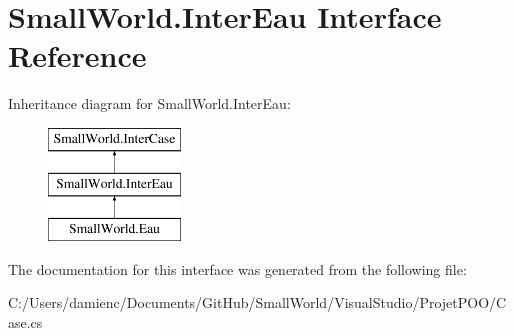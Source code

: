 \hypertarget{interface_small_world_1_1_inter_eau}{\section{Small\-World.\-Inter\-Eau Interface Reference}
\label{interface_small_world_1_1_inter_eau}
}
Inheritance diagram for Small\-World.\-Inter\-Eau\-:\begin{figure}[H]
\begin{center}
\leavevmode
\includegraphics[height=3.000000cm]{interface_small_world_1_1_inter_eau}
\end{center}
\end{figure}


The documentation for this interface was generated from the following file\-:\begin{DoxyCompactItemize}
\item 
C\-:/\-Users/damienc/\-Documents/\-Git\-Hub/\-Small\-World/\-Visual\-Studio/\-Projet\-P\-O\-O/Case.\-cs\end{DoxyCompactItemize}
